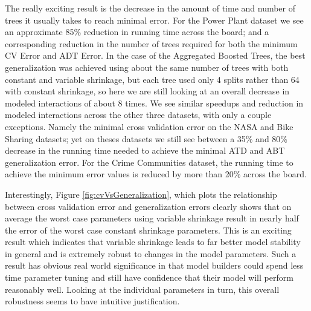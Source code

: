 \documentclass[9pt, conference]{IEEEtran}
\begin{document}
The really exciting result is the decrease in the amount of time and number of trees it usually takes to reach minimal error. For the Power Plant dataset we see an approximate 85\% reduction in running time across the board; and a corresponding reduction in the number of trees required for both the minimum CV Error and ADT Error. In the case of the Aggregated Boosted Trees, the best generalization was achieved using about the same number of trees with both constant and variable shrinkage, but each tree used only 4 splits rather than 64 with constant shrinkage, so here we are still looking at an overall decrease in modeled interactions of about 8 times. We see similar speedups and reduction in modeled interactions across the other three datasets, with only a couple exceptions. Namely the minimal cross validation error on the NASA and Bike Sharing datasets; yet on theses datasets we still see between a 35\% and 80\% decrease in the running time needed to achieve the minimal ATD and ABT generalization error. For the Crime Communities dataset, the running time to achieve the minimum error values is reduced by more than 20\% across the board.

Interestingly, Figure \ref{fig:cvVsGeneralization}, which plots the relationship between cross validation error and generalization errors clearly shows that on average the worst case parameters using variable shrinkage result in nearly half the error of the worst case constant shrinkage parameters. This is an exciting result which indicates that variable shrinkage leads to far better model stability in general and is extremely robust to changes in the model parameters. Such a result has obvious real world significance in that model builders could spend less time parameter tuning and still have confidence that their model will perform reasonably well. Looking at the individual parameters in turn, this overall robustness seems to have intuitive justification.
\end{document}
